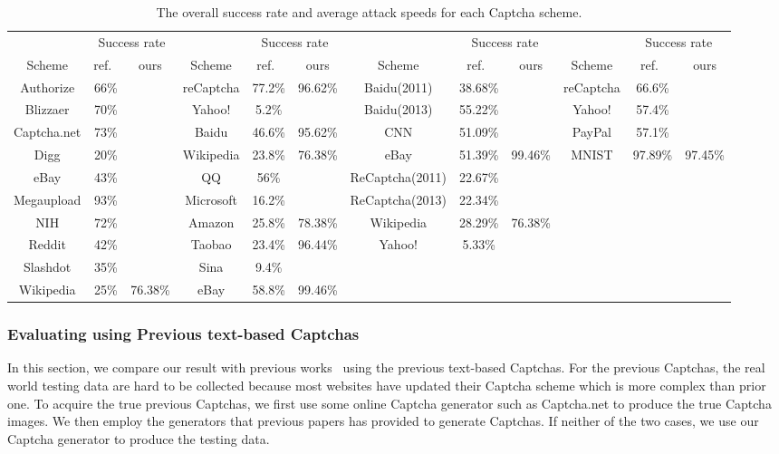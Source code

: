 \begin{table}[t]
    \centering
    \caption{The overall success rate and average attack speeds for each Captcha scheme.}
    \label{table: overall_rate}
    \scriptsize
    \begin{tabular}{|c|c|c|c|c|c|c|c|c|c|c|c|}
        \hline
        & \multicolumn{2}{|c|}{Success rate}& & \multicolumn{2}{|c|}{Success rate} & &\multicolumn{2}{|c|}{Success rate} & & \multicolumn{2}{|c|}{Success rate}\\
        \cline{2-3} \cline{5-6} \cline{8-9} \cline{11-12}
        \multirow{-2}{*}{Scheme} & ref.~\cite{Bursztein2011Text} & ours & \multirow{-2}{*}{Scheme} & ref.~\cite{Gao2016A} & ours & \multirow{-2}{*}{Scheme} & ref.~\cite{Bursztein2014The} & ours & \multirow{-2}{*}{Scheme} & ref.~\cite{George2017A} & ours \\
        \hline
        Authorize & 66\% & & reCaptcha & 77.2\% & 96.62\% & Baidu(2011) & 38.68\% & & reCaptcha & 66.6\% & \\
        \hline
        Blizzaer & 70\% & & Yahoo! & 5.2\% & & Baidu(2013) & 55.22\% & & Yahoo! & 57.4\% & \\
        \hline
        Captcha.net & 73\% & & Baidu & 46.6\% & 95.62\% & CNN & 51.09\% & & PayPal & 57.1\% & \\
        \hline
        Digg & 20\% & & Wikipedia & 23.8\% & 76.38\% & eBay & 51.39\% & 99.46\% & MNIST & 97.89\% & 97.45\% \\
        \hline
        eBay & 43\% & & QQ & 56\% & & ReCaptcha(2011) & 22.67\% & & & &\\
        \hline
        Megaupload & 93\% & & Microsoft & 16.2\% & & ReCaptcha(2013) & 22.34\% & & & & \\
        \hline
        NIH & 72\% & & Amazon & 25.8\% & 78.38\% & Wikipedia & 28.29\% & 76.38\% & & & \\
        \hline
        Reddit & 42\% & & Taobao & 23.4\% & 96.44\% & Yahoo! & 5.33\% & & & &  \\
        \hline
        Slashdot & 35\% & & Sina & 9.4\% & & & & & & & \\
        \hline
        Wikipedia & 25\% & 76.38\% & eBay & 58.8\% & 99.46\% & & & & & & \\
        \hline
    \end{tabular}
\end{table}

\subsubsection{Evaluating using Previous text-based Captchas}
In this section, we compare our result with previous works~\cite{Bursztein2011Text,Gao2016A,Bursztein2014The,George2017A} using the previous text-based Captchas.
For the previous Captchas, the real world testing data are hard to be collected because most websites have updated their Captcha scheme which is more complex than prior one. To acquire the true previous Captchas, we first use some online Captcha generator such as Captcha.net to produce the true Captcha images. We then employ the generators that previous papers has provided to generate Captchas. If neither of the two cases, we use our Captcha generator to produce the testing data.

